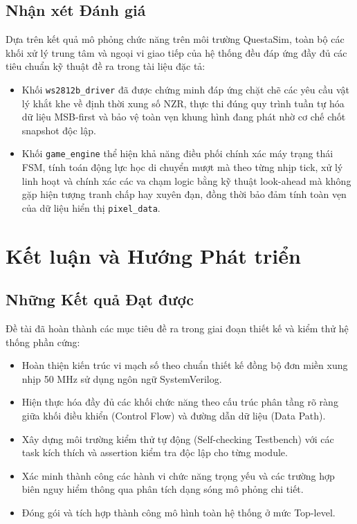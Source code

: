 \documentclass[12pt,a4paper]{article}
\begin{document}
\subsection{Nhận xét Đánh giá}
Dựa trên kết quả mô phỏng chức năng trên môi trường QuestaSim, toàn bộ các khối xử lý trung tâm và ngoại vi giao tiếp của hệ thống đều đáp ứng đầy đủ các tiêu chuẩn kỹ thuật đề ra trong tài liệu đặc tả:
\begin{itemize}
    \item Khối \texttt{ws2812b\_driver} đã được chứng minh đáp ứng chặt chẽ các yêu cầu vật lý khắt khe về định thời xung số NZR, thực thi đúng quy trình tuần tự hóa dữ liệu MSB-first và bảo vệ toàn vẹn khung hình đang phát nhờ cơ chế chốt snapshot độc lập.
    \item Khối \texttt{game\_engine} thể hiện khả năng điều phối chính xác máy trạng thái FSM, tính toán động lực học di chuyển mượt mà theo từng nhịp tick, xử lý linh hoạt và chính xác các va chạm logic bằng kỹ thuật look-ahead mà không gặp hiện tượng tranh chấp hay xuyên đạn, đồng thời bảo đảm tính toàn vẹn của dữ liệu hiển thị \texttt{pixel\_data}.
\end{itemize}

\section{Kết luận và Hướng Phát triển}

\subsection{Những Kết quả Đạt được}
Đề tài đã hoàn thành các mục tiêu đề ra trong giai đoạn thiết kế và kiểm thử hệ thống phần cứng:
\begin{itemize}
    \item Hoàn thiện kiến trúc vi mạch số theo chuẩn thiết kế đồng bộ đơn miền xung nhịp 50 MHz sử dụng ngôn ngữ SystemVerilog.
    \item Hiện thực hóa đầy đủ các khối chức năng theo cấu trúc phân tầng rõ ràng giữa khối điều khiển (Control Flow) và đường dẫn dữ liệu (Data Path).
    \item Xây dựng môi trường kiểm thử tự động (Self-checking Testbench) với các task kích thích và assertion kiểm tra độc lập cho từng module.
    \item Xác minh thành công các hành vi chức năng trọng yếu và các trường hợp biên nguy hiểm thông qua phân tích dạng sóng mô phỏng chi tiết.
    \item Đóng gói và tích hợp thành công mô hình toàn hệ thống ở mức Top-level.
\end{itemize}
\end{document}
